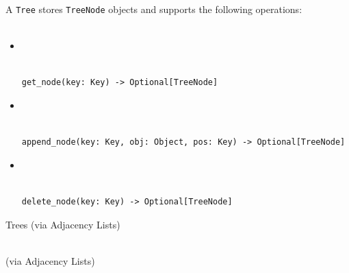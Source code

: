 \documentclass[mathserif, handout]{beamer}
\begin{document}
\begin{frame}
\begin{defboxbot}
\begin{minipage}[t][5cm][t]{0.5\textwidth}
\begin{figure}
      \end{figure}
    \end{minipage}%
  \end{defboxbot}
\end{frame}

\begin{frame}[fragile]
  A \texttt{Tree} stores \texttt{TreeNode} objects and supports the following operations:\\~\\
  \begin{itemize}

    \item {} \\
          \\[-1mm]
          \begin{lstlisting}[style=mypython]
get_node(key: Key) -> Optional[TreeNode]
\end{lstlisting}

    \item {} \\
          \\[-1mm]
          \begin{lstlisting}[style=mypython]
append_node(key: Key, obj: Object, pos: Key) -> Optional[TreeNode]
\end{lstlisting}

    \item {} \\
          \\[-1mm]
          \begin{lstlisting}[style=mypython]
delete_node(key: Key) -> Optional[TreeNode]
\end{lstlisting}

  \end{itemize}
\end{frame}

\begin{frame}{Trees (via Adjacency Lists)}
  \begin{center}
    \Large {} \\[1mm]
    \normalsize \color{gray} (via Adjacency Lists)
  \end{center}
\end{frame}
\end{document}
